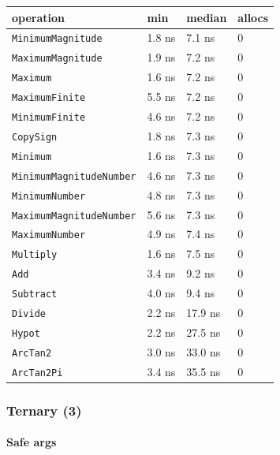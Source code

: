 \begin{table}[h]
\centering
\nopagebreak[3]
\begin{tabulary}{\linewidth}{L L L L}
\toprule
operation & min & median & allocs \\
\toprule
\texttt{MinimumMagnitude} & 1.8 ns & 7.1 ns & 0 \\
\texttt{MaximumMagnitude} & 1.9 ns & 7.2 ns & 0 \\
\texttt{Maximum} & 1.6 ns & 7.2 ns & 0 \\
\texttt{MaximumFinite} & 5.5 ns & 7.2 ns & 0 \\
\texttt{MinimumFinite} & 4.6 ns & 7.2 ns & 0 \\
\texttt{CopySign} & 1.8 ns & 7.3 ns & 0 \\
\texttt{Minimum} & 1.6 ns & 7.3 ns & 0 \\
\texttt{MinimumMagnitudeNumber} & 4.6 ns & 7.3 ns & 0 \\
\texttt{MinimumNumber} & 4.8 ns & 7.3 ns & 0 \\
\texttt{MaximumMagnitudeNumber} & 5.6 ns & 7.3 ns & 0 \\
\texttt{MaximumNumber} & 4.9 ns & 7.4 ns & 0 \\
\texttt{Multiply} & 1.6 ns & 7.5 ns & 0 \\
\texttt{Add} & 3.4 ns & 9.2 ns & 0 \\
\texttt{Subtract} & 4.0 ns & 9.4 ns & 0 \\
\texttt{Divide} & 2.2 ns & 17.9 ns & 0 \\
\texttt{Hypot} & 2.2 ns & 27.5 ns & 0 \\
\texttt{ArcTan2} & 3.0 ns & 33.0 ns & 0 \\
\texttt{ArcTan2Pi} & 3.4 ns & 35.5 ns & 0 \\
\bottomrule
\end{tabulary}

\end{table}



\subsubsection{Ternary (3)}



\label{1836852574804533888}{}


\paragraph{Safe args}\indent



